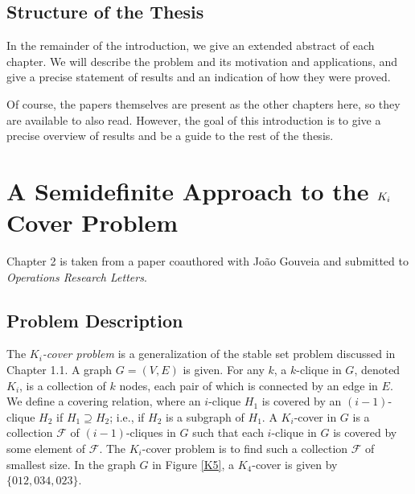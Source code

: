 \subsection{Structure of the Thesis}
In the remainder of the introduction, we give an extended abstract of each
chapter. We will describe the problem and its motivation and applications,
and give a precise statement of results and an indication of how they were 
proved.

Of course, the papers themselves are present as the other chapters here, so
they are available to also read. However, the goal of this introduction
is to give a precise overview of results and be a guide to the rest of the
thesis.

\section{A Semidefinite Approach to the $K_\MakeLowercase{i}$ Cover Problem}
Chapter 2 is taken from a paper coauthored with Jo\~ao Gouveia and submitted to 
\emph{Operations Research Letters}. 

\subsection{Problem Description}

The {\em $K_i$-cover problem} is a generalization of the stable set problem discussed
in Chapter 1.1. A graph $G = (V,E)$ is given. For any $k$, a $k$-clique in $G$,
denoted $K_i$,
is a collection of $k$ nodes, each pair of which is connected by an edge in $E$.
We define a covering relation, where an $i$-clique $H_1$ is covered by an 
$(i-1)$-clique $H_2$ if $H_1 \supseteq H_2$; i.e., if $H_2$ is a subgraph of
$H_1$. A $K_i$-cover in $G$ is a
collection $\mathcal{F}$ of $(i-1)$-cliques in $G$ such that each $i$-clique in $G$
is covered by some element of $\mathcal{F}$. The $K_i$-cover problem is to find such a
collection $\mathcal{F}$ of smallest size.
In the graph $G$ in Figure \ref{K5}, a $K_4$-cover is given by $\{012,034,023\}$.

